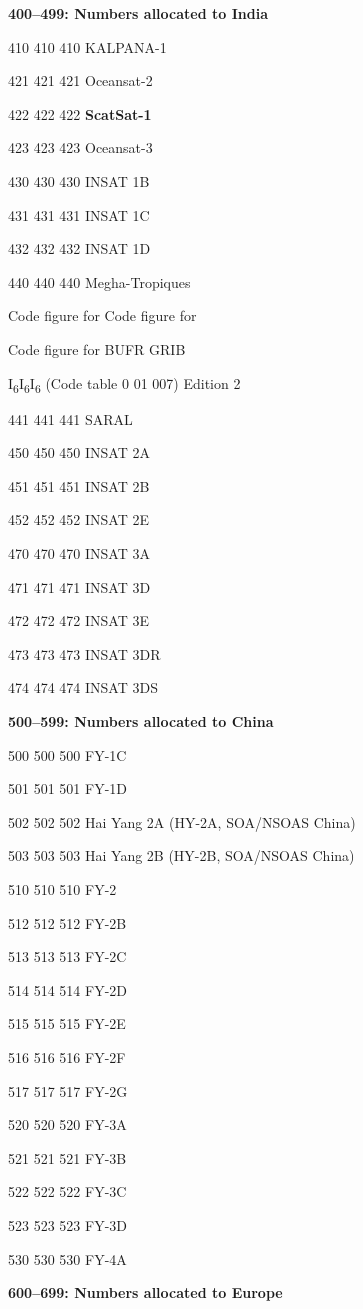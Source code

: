 \textbf{400--499: Numbers allocated to India}

410 410 410 KALPANA-1

421 421 421 Oceansat-2

422 422 422 \textbf{ScatSat-1}

423 423 423 Oceansat-3

430 430 430 INSAT 1B

431 431 431 INSAT 1C

432 432 432 INSAT 1D

440 440 440 Megha-Tropiques

Code figure for Code figure for

Code figure for BUFR GRIB

I\textsubscript{6}I\textsubscript{6}I\textsubscript{6} (Code table 0 01 007) Edition 2

441 441 441 SARAL

450 450 450 INSAT 2A

451 451 451 INSAT 2B

452 452 452 INSAT 2E

470 470 470 INSAT 3A

471 471 471 INSAT 3D

472 472 472 INSAT 3E

473 473 473 INSAT 3DR

474 474 474 INSAT 3DS

\textbf{500--599: Numbers allocated to China}

500 500 500 FY-1C

501 501 501 FY-1D

502 502 502 Hai Yang 2A (HY-2A, SOA/NSOAS China)

503 503 503 Hai Yang 2B (HY-2B, SOA/NSOAS China)

510 510 510 FY-2

512 512 512 FY-2B

513 513 513 FY-2C

514 514 514 FY-2D

515 515 515 FY-2E

516 516 516 FY-2F

517 517 517 FY-2G

520 520 520 FY-3A

521 521 521 FY-3B

522 522 522 FY-3C

523 523 523 FY-3D

530 530 530 FY-4A

\textbf{600--699: Numbers allocated to Europe}


